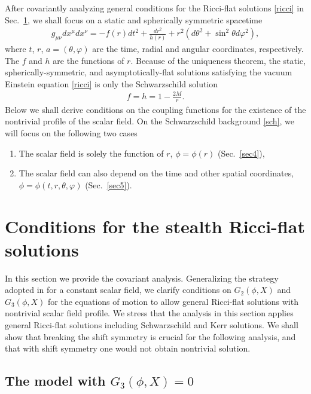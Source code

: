 \documentclass[prd,amsmath,amssymb,floatfix,superscriptaddress,notitlepage,nofootinbib,preprintnumbers]{revtex4-1}
\begin{document}
After covariantly analyzing general conditions for the Ricci-flat solutions \eqref{ricci} in Sec.~\ref{sec3}, 
we shall focus on a static and spherically symmetric spacetime
\begin{align}
\label{sss}
g_{\mu\nu}dx^\mu dx^\nu
=-f(r)dt^2 +\frac{dr^2}{h(r)}+r^2 (d\theta^2+\sin^2\theta d\varphi^2),
\end{align}
where 
$t$, $r$, $a=(\theta,\varphi)$
are the time, radial and angular coordinates, 
respectively.
The $f$ and $h$ are the functions of $r$.
Because of the uniqueness theorem,
the static, spherically-symmetric, 
and asymptotically-flat solutions satisfying 
the vacuum Einstein equation \eqref{ricci}
is only the Schwarzschild solution
\begin{align}
\label{sch}
f=h=1-\frac{2M}{r}.
\end{align}
Below we shall derive conditions on the coupling functions 
for the existence of the nontrivial profile of the scalar field.
On the Schwarzschild background \eqref{sch},
we will focus on the following two cases
\begin{enumerate}
\item{The scalar field is solely the function of $r$, $\phi=\phi(r)$ (Sec.~\ref{sec4}),}
\item{The scalar field can also depend on the time and other spatial coordinates, $\phi=\phi(t,r,\theta,\varphi)$ (Sec.~\ref{sec5}).}
\end{enumerate}



\section{Conditions for the stealth Ricci-flat solutions}
\label{sec3}


In this section we provide the covariant analysis.
Generalizing the strategy adopted in \cite{Motohashi:2018wdq} for a constant scalar field, 
we clarify conditions on $G_2(\phi,X)$ and $G_3(\phi,X)$ for the equations of motion
to allow general Ricci-flat solutions with nontrivial scalar field profile.
We stress that the analysis in this section applies 
general Ricci-flat solutions including 
Schwarzschild and Kerr solutions.
We shall show that breaking the shift symmetry is crucial for the following analysis, 
and that with shift symmetry one would not obtain nontrivial solution.


\subsection{The model with $G_3(\phi,X)=0$}
\label{sec31}
\end{document}
